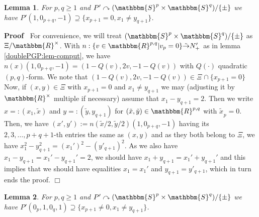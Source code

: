 \documentclass{article}
\newcommand{\assign}{:=}
\newenvironment{proof}{\noindent\textbf{Proof\ }}{\hspace*{\fill}$\Box$\medskip}
\numberwithin{definition}{section}
\newtheorem{lemma}{Lemma}
\numberwithin{lemma}{section}
\numberwithin{proposition}{section}
{\theorembodyfont{\rmfamily}\newtheorem{remark}{Remark}
\numberwithin{remark}{section}
}
\begin{document}
\begin{lemma}
  \label{doublePGP:lem-ne}For $p, q \geqslant 1$ and $P' \curvearrowright (
  \mathbbm{S}^p \times \mathbbm{S}^q) / \{ \pm \}$ we have $P' ( 1, 0_{p + q},
  - 1) \supseteq \{ x_{p + 1} = 0, x_1 \neq y_{q + 1} \}$.
\end{lemma}

\begin{proof}
  For convenience, we will treat $( \mathbbm{S}^p \times \mathbbm{S}^q) / \{
  \pm \}$ as $\Xi /\mathbbm{R}^{\times}$. With $n : \{ v \in \mathbbm{R}^{p,
  q} | v_p = 0 \} \tilde{\rightarrow} N_+'$ as in lemma
  \ref{doublePGP:lem-comput}, we have $n ( x) ( 1, 0_{p + q}, - 1) = ( 1 - Q (
  v), 2 v, - 1 - Q ( v))$ with $Q ( \cdot)$ quadratic $( p, q)$-form. We note
  that $( 1 - Q ( v), 2 v, - 1 - Q ( v)) \in \Xi^{} \cap \{ x_{p + 1} = 0 \}$
  Now, if $( x, y) \in \Xi$ with $x_{p + 1} = 0$ and $x_1 \neq y_{q + 1}$ we
  may (adjusting it by $\mathbbm{R}^{\times}$ multiple if necessary) assume
  that $x_1 - y_{q + 1} = 2$. Then we write $x = : ( x_1, \tilde{x})$ and $y =
  : ( \tilde{y}, y_{q + 1})$ for $( \tilde{x}, \tilde{y}) \in \mathbbm{R}^{p,
  q}$ with $\widetilde{x_{}}_p = 0$. Then, we have $( x', y') \assign n (
  \tilde{x} / 2, \tilde{y} / 2) ( 1, 0_{p + q}, - 1)$ having its $2, 3,
  \ldots, p + q + 1$-th entries the same as $( x, y)$ and as they both belong
  to $\Xi$, we have $x_1^2 - y_{q + 1}^2 = ( x_1')^2 - ( y'_{q + 1})^2$. As we
  also have $x_1 - y_{q + 1} = x_1' - y_{q + 1}' = 2$, we should have $x_1 +
  y_{q + 1} = x_1' + y_{q + 1}'$ and this implies that we should have
  equalities $x_1 = x_1'$ and $y_{q + 1} = y'_{q + 1}$, which in turn ends the
  proof.
\end{proof}

\begin{lemma}
  \label{doublePGP:lem-nn}\label{doublePGP:lem-nn}For $p, q \geqslant 1$ and
  $P' \curvearrowright ( \mathbbm{S}^p \times \mathbbm{S}^q) / \{ \pm \}$ we
  have $P' ( 0_p, 1, 0_q, 1) \supseteq \{ x_{p + 1} \neq 0, x_1 \neq y_{q + 1}
  \}$.
\end{lemma}
\end{document}
